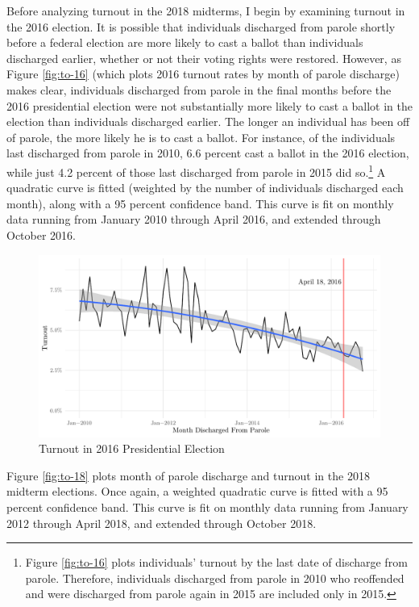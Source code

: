 \documentclass[
  12pt,
]{article}
\begin{document}
Before analyzing turnout in the 2018 midterms, I begin by examining turnout in the 2016 election. It is possible that individuals discharged from parole shortly before a federal election are more likely to cast a ballot than individuals discharged earlier, whether or not their voting rights were restored. However, as Figure \ref{fig:to-16} (which plots 2016 turnout rates by month of parole discharge) makes clear, individuals discharged from parole in the final months before the 2016 presidential election were not substantially more likely to cast a ballot in the election than individuals discharged earlier. The longer an individual has been off of parole, the more likely he is to cast a ballot. For instance, of the individuals last discharged from parole in 2010, 6.6 percent cast a ballot in the 2016 election, while just 4.2 percent of those last discharged from parole in 2015 did so.\footnote{Figure \ref{fig:to-16} plots individuals' turnout by the last date of discharge from parole. Therefore, individuals discharged from parole in 2010 who reoffended and were discharged from parole again in 2015 are included only in 2015.} A quadratic curve is fitted (weighted by the number of individuals discharged each month), along with a 95 percent confidence band. This curve is fit on monthly data running from January 2010 through April 2016, and extended through October 2016.

\begin{figure}[H]

{\centering \includegraphics{felony_disenfranchisement_nys_files/figure-latex/to-16-chart-1} 

}

\caption{\label{fig:to-16}Turnout in 2016 Presidential Election}\label{fig:to-16-chart}
\end{figure}

Figure \ref{fig:to-18} plots month of parole discharge and turnout in the 2018 midterm elections. Once again, a weighted quadratic curve is fitted with a 95 percent confidence band. This curve is fit on monthly data running from January 2012 through April 2018, and extended through October 2018.
\end{document}
